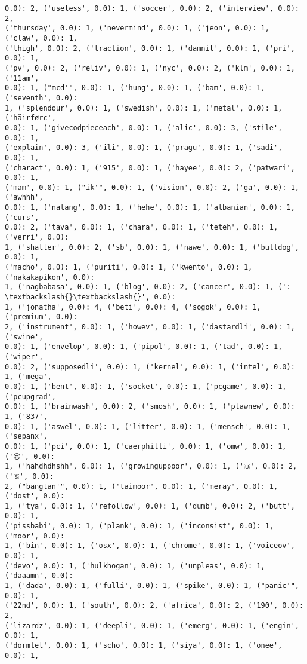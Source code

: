 \documentclass[11pt]{article}
\begin{document}
\begin{Verbatim}[commandchars=\\\{\}]
0.0): 2, ('useless', 0.0): 1, ('soccer', 0.0): 2, ('interview', 0.0): 2,
('thursday', 0.0): 1, ('nevermind', 0.0): 1, ('jeon', 0.0): 1, ('claw', 0.0): 1,
('thigh', 0.0): 2, ('traction', 0.0): 1, ('damnit', 0.0): 1, ('pri', 0.0): 1,
('pv', 0.0): 2, ('reliv', 0.0): 1, ('nyc', 0.0): 2, ('klm', 0.0): 1, ('11am',
0.0): 1, ("mcd'", 0.0): 1, ('hung', 0.0): 1, ('bam', 0.0): 1, ('seventh', 0.0):
1, ('splendour', 0.0): 1, ('swedish', 0.0): 1, ('metal', 0.0): 1, ('häirførc',
0.0): 1, ('givecodpieceach', 0.0): 1, ('alic', 0.0): 3, ('stile', 0.0): 1,
('explain', 0.0): 3, ('ili', 0.0): 1, ('pragu', 0.0): 1, ('sadi', 0.0): 1,
('charact', 0.0): 1, ('915', 0.0): 1, ('hayee', 0.0): 2, ('patwari', 0.0): 1,
('mam', 0.0): 1, ("ik'", 0.0): 1, ('vision', 0.0): 2, ('ga', 0.0): 1, ('awhhh',
0.0): 1, ('nalang', 0.0): 1, ('hehe', 0.0): 1, ('albanian', 0.0): 1, ('curs',
0.0): 2, ('tava', 0.0): 1, ('chara', 0.0): 1, ('teteh', 0.0): 1, ('verri', 0.0):
1, ('shatter', 0.0): 2, ('sb', 0.0): 1, ('nawe', 0.0): 1, ('bulldog', 0.0): 1,
('macho', 0.0): 1, ('puriti', 0.0): 1, ('kwento', 0.0): 1, ('nakakapikon', 0.0):
1, ('nagbabasa', 0.0): 1, ('blog', 0.0): 2, ('cancer', 0.0): 1, (':-\textbackslash{}\textbackslash{}', 0.0):
1, ('jonatha', 0.0): 4, ('beti', 0.0): 4, ('sogok', 0.0): 1, ('premium', 0.0):
2, ('instrument', 0.0): 1, ('howev', 0.0): 1, ('dastardli', 0.0): 1, ('swine',
0.0): 1, ('envelop', 0.0): 1, ('pipol', 0.0): 1, ('tad', 0.0): 1, ('wiper',
0.0): 2, ('supposedli', 0.0): 1, ('kernel', 0.0): 1, ('intel', 0.0): 1, ('mega',
0.0): 1, ('bent', 0.0): 1, ('socket', 0.0): 1, ('pcgame', 0.0): 1, ('pcupgrad',
0.0): 1, ('brainwash', 0.0): 2, ('smosh', 0.0): 1, ('plawnew', 0.0): 1, ('837',
0.0): 1, ('aswel', 0.0): 1, ('litter', 0.0): 1, ('mensch', 0.0): 1, ('sepanx',
0.0): 1, ('pci', 0.0): 1, ('caerphilli', 0.0): 1, ('omw', 0.0): 1, ('😍', 0.0):
1, ('hahdhdhshh', 0.0): 1, ('growinguppoor', 0.0): 1, ('🇺', 0.0): 2, ('🇸', 0.0):
2, ("bangtan'", 0.0): 1, ('taimoor', 0.0): 1, ('meray', 0.0): 1, ('dost', 0.0):
1, ('tya', 0.0): 1, ('refollow', 0.0): 1, ('dumb', 0.0): 2, ('butt', 0.0): 1,
('pissbabi', 0.0): 1, ('plank', 0.0): 1, ('inconsist', 0.0): 1, ('moor', 0.0):
1, ('bin', 0.0): 1, ('osx', 0.0): 1, ('chrome', 0.0): 1, ('voiceov', 0.0): 1,
('devo', 0.0): 1, ('hulkhogan', 0.0): 1, ('unpleas', 0.0): 1, ('daaamn', 0.0):
1, ('dada', 0.0): 1, ('fulli', 0.0): 1, ('spike', 0.0): 1, ("panic'", 0.0): 1,
('22nd', 0.0): 1, ('south', 0.0): 2, ('africa', 0.0): 2, ('190', 0.0): 2,
('lizardz', 0.0): 1, ('deepli', 0.0): 1, ('emerg', 0.0): 1, ('engin', 0.0): 1,
('dormtel', 0.0): 1, ('scho', 0.0): 1, ('siya', 0.0): 1, ('onee', 0.0): 1,

\end{Verbatim}
\end{document}
